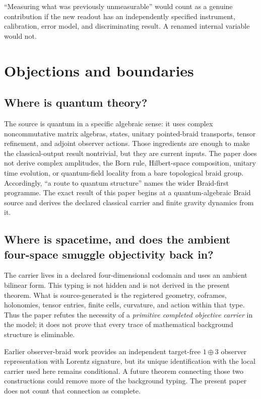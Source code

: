 \documentclass[11pt]{article}
\theoremstyle{definition}
\theoremstyle{remark}
\begin{document}
``Measuring what was previously unmeasurable'' would count as a genuine contribution if the new readout has an independently specified instrument, calibration, error model, and discriminating result. A renamed internal variable would not.

\section{Objections and boundaries}

\subsection{Where is quantum theory?}

The source is quantum in a specific algebraic sense: it uses complex noncommutative matrix algebras, states, unitary pointed-braid transports, tensor refinement, and adjoint observer actions. Those ingredients are enough to make the classical-output result nontrivial, but they are current inputs. The paper does not derive complex amplitudes, the Born rule, Hilbert-space composition, unitary time evolution, or quantum-field locality from a bare topological braid group. Accordingly, ``a route to quantum structure'' names the wider Braid-first programme. The exact result of this paper begins at a quantum-algebraic Braid source and derives the declared classical carrier and finite gravity dynamics from it.

\subsection{Where is spacetime, and does the ambient four-space smuggle objectivity back in?}

The carrier lives in a declared four-dimensional codomain and uses an ambient bilinear form. This typing is not hidden and is not derived in the present theorem. What is source-generated is the registered geometry, coframes, holonomies, tensor entries, finite cells, curvature, and action within that type. Thus the paper refutes the necessity of a \emph{primitive completed objective carrier} in the model; it does not prove that every trace of mathematical background structure is eliminable.

Earlier observer-braid work provides an independent target-free $1\oplus3$ observer representation with Lorentz signature, but its unique identification with the local carrier used here remains conditional. A future theorem connecting those two constructions could remove more of the background typing. The present paper does not count that connection as complete.
\end{document}
